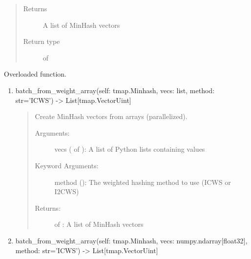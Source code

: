 \documentclass[letterpaper,10pt,english]{sphinxmanual}
\begin{document}
\begin{fulllineitems}
\begin{fulllineitems}
\begin{quote}
\begin{description}
\item[{Returns}] \leavevmode
A list of MinHash vectors

\item[{Return type}] \leavevmode
{} of 

\end{description}\end{quote}

\end{fulllineitems}


\begin{fulllineitems}
\label{\detokenize{documentation:tmap.Minhash.batch_from_weight_array}}
Overloaded function.
\begin{enumerate}
\def\theenumi{\arabic{enumi}}
\def\labelenumi{\theenumi .}
\makeatletter\def\p@enumii{\p@enumi \theenumi .}\makeatother
\item {} 
batch\_from\_weight\_array(self: tmap.Minhash, vecs: list, method: str=’ICWS’) -\textgreater{} List{[}tmap.VectorUint{]}
\begin{quote}

Create MinHash vectors from  arrays (parallelized).
\begin{description}
\item[{Arguments:}] \leavevmode
vecs ( of ): A list of Python lists containing  values

\item[{Keyword Arguments:}] \leavevmode
method (): The weighted hashing method to use (ICWS or I2CWS)

\item[{Returns:}] \leavevmode
{} of : A list of MinHash vectors

\end{description}
\end{quote}

\item {} 
batch\_from\_weight\_array(self: tmap.Minhash, vecs: numpy.ndarray{[}float32{]}, method: str=’ICWS’) -\textgreater{} List{[}tmap.VectorUint{]}
\begin{quote}


\end{quote}
\end{enumerate}
\end{fulllineitems}
\end{fulllineitems}
\end{document}
